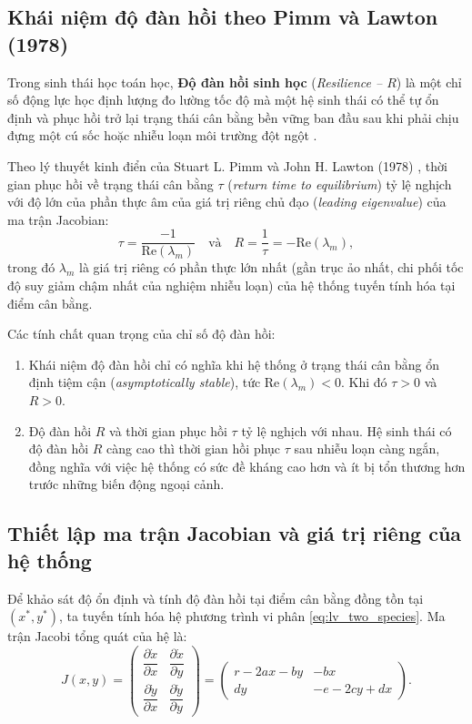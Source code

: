 \subsection{Khái niệm độ đàn hồi theo Pimm và Lawton (1978)}
Trong sinh thái học toán học, \textbf{Độ đàn hồi sinh học} (\textit{Resilience -- $R$}) là một chỉ số động lực học định lượng đo lường tốc độ mà một hệ sinh thái có thể tự ổn định và phục hồi trở lại trạng thái cân bằng bền vững ban đầu sau khi phải chịu đựng một cú sốc hoặc nhiễu loạn môi trường đột ngột \cite{pimm1978feeding}.

Theo lý thuyết kinh điển của Stuart L. Pimm và John H. Lawton (1978) \cite{pimm1978feeding}, thời gian phục hồi về trạng thái cân bằng $\tau$ (\textit{return time to equilibrium}) tỷ lệ nghịch với độ lớn của phần thực âm của giá trị riêng chủ đạo (\textit{leading eigenvalue}) của ma trận Jacobian:
\begin{equation}
\label{eq:resilience_def}
\tau = \frac{-1}{\mathrm{Re}(\lambda_m)} \quad \text{và} \quad R = \frac{1}{\tau} = -\mathrm{Re}(\lambda_m),
\end{equation}
trong đó $\lambda_m$ là giá trị riêng có phần thực lớn nhất (gần trục ảo nhất, chi phối tốc độ suy giảm chậm nhất của nghiệm nhiễu loạn) của hệ thống tuyến tính hóa tại điểm cân bằng.

\begin{nhanxet}
Các tính chất quan trọng của chỉ số độ đàn hồi:
\begin{enumerate}
    \item Khái niệm độ đàn hồi chỉ có nghĩa khi hệ thống ở trạng thái cân bằng ổn định tiệm cận (\textit{asymptotically stable}), tức $\mathrm{Re}(\lambda_m) < 0$. Khi đó $\tau > 0$ và $R > 0$.
    \item Độ đàn hồi $R$ và thời gian phục hồi $\tau$ tỷ lệ nghịch với nhau. Hệ sinh thái có độ đàn hồi $R$ càng cao thì thời gian hồi phục $\tau$ sau nhiễu loạn càng ngắn, đồng nghĩa với việc hệ thống có sức đề kháng cao hơn và ít bị tổn thương hơn trước những biến động ngoại cảnh.
\end{enumerate}
\end{nhanxet}

\subsection{Thiết lập ma trận Jacobian và giá trị riêng của hệ thống}
Để khảo sát độ ổn định và tính độ đàn hồi tại điểm cân bằng đồng tồn tại $(x^*, y^*)$, ta tuyến tính hóa hệ phương trình vi phân \eqref{eq:lv_two_species}. Ma trận Jacobi tổng quát của hệ là:
\begin{equation}
J(x, y) = \begin{pmatrix}
\dfrac{\partial \dot{x}}{\partial x} & \dfrac{\partial \dot{x}}{\partial y} \\[10pt]
\dfrac{\partial \dot{y}}{\partial x} & \dfrac{\partial \dot{y}}{\partial y}
\end{pmatrix} = \begin{pmatrix}
r - 2ax - by & -bx \\
dy & -e - 2cy + dx
\end{pmatrix}.
\end{equation}

